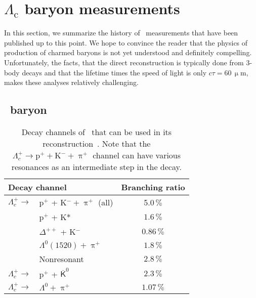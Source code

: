\section{$\Lambda_\mathrm{c}$ baryon measurements}
In this section, we summarize the history of \Lambdac\ measurements that have been published up to this point. We hope to convince the reader that the physics of production of charmed baryons is not yet understood and definitely compelling. Unfortunately, the facts, that the direct reconstruction is typically done from 3-body decays and that the lifetime times the speed of light is only $c\tau = 60\,\upmu$m, makes these analyses relatively challenging.

\subsection{\Lambdac\ baryon}

\begin{table}[htb]
\caption[Decay channels of \Lambdac\ that can be used in its reconstruction.]{\label{tab:lcDecayCahnnels}Decay channels of \Lambdac\ that can be used in its reconstruction~\cite{PDG}. Note that the $\Lambda_c^+ \rightarrow \mathrm{p}^+ + \mathrm{K}^- + \uppi^+$ channel can have various resonances as an intermediate step in the decay.}
\begin{center}
\begin{tabular}{llc}
\toprule
\multicolumn{2}{l}{Decay channel} & Branching ratio  \\
\midrule
$\Lambda_c^+ \rightarrow$ &  p$^+$ + K$^- + \uppi^+$ (all) & 5.0$\,\%$ \\
  & p$^+$ + K* & $1.6\,\%$ \\
  & $\Delta^{++}$ + K$^-$ & $0.86\,\%$ \\
  & $\Lambda^0(1520) + \uppi^+$ & $1.8\,\%$ \\
  & Nonresonant & $2.8\,\%$ \\
$\Lambda_c^+ \rightarrow$ &  p$^+$ + $\overline{\mathsf{K}}^0$ & $2.3\,\% $ \\
$\Lambda_c^+ \rightarrow$ & $ \Lambda^0 + \uppi^+$ & $1.07\,\%$ \\
\bottomrule
\end{tabular}
\end{center}
\end{table}


